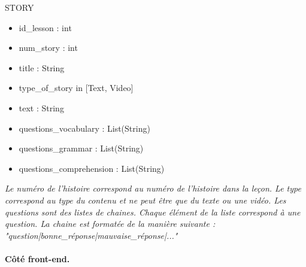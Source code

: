 \begin{flushleft}
STORY \linebreak
\begin{itemize}
	\item id\_lesson : int \linebreak
	\item num\_story : int \linebreak
	\item title : String \linebreak
	\item type\_of\_story in [Text, Video] \linebreak
	\item text : String \linebreak
	\item questions\_vocabulary : List(String) \linebreak
	\item questions\_grammar : List(String) \linebreak
	\item questions\_comprehension : List(String)  \linebreak
\end{itemize}

\emph{Le numéro de l'histoire correspond au numéro de l'histoire dans la leçon. Le type correspond au type du contenu et ne peut être que du texte ou une vidéo. Les questions sont des listes de chaines. Chaque élément de la liste correspond à une question. La chaine est formatée de la manière suivante : "question|bonne\_réponse|mauvaise\_réponse|..."} \linebreak
\end{flushleft}

\paragraph{Côté front-end.}

